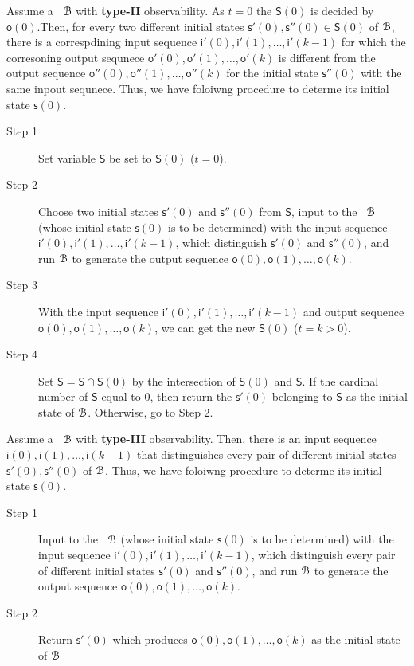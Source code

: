  Assume a \BCN\ ${\mathcal{B}}$  with {\bf type-II}  observability. As $t=0$ the $\mathsf{S}(0)$ is decided by $\mathsf{o}(0)$.Then, for every two different initial states $\mathsf{s}'(0), \mathsf{s}''(0)\in \mathsf{S}(0)$ of ${\mathcal{B}}$, there is a correspdining input sequence $\mathsf{i}'(0),\mathsf{i}'(1),\ldots, \mathsf{i}'(k-1)$ for which the corresoning output sequnece $\mathsf{o}'(0),\mathsf{o}'(1),\ldots,\mathsf{o}'(k)$ is different from the output sequence $\mathsf{o}''(0),\mathsf{o}''(1),\ldots,\mathsf{o}''(k)$ for the initial state $\mathsf{s}''(0)$ with the same inpout sequnece. Thus, we have foloiwng procedure to determe its initial state $\mathsf{s}(0)$.
\begin{description}
	\item[Step 1]  Set variable $\mathsf{S}$ be set to $\mathsf{S}(0)$ ($t=0$).
	\item[Step 2] Choose two initial states $\mathsf{s}'(0)$ and $\mathsf{s}''(0)$ from $\mathsf{S}$, input to the \BCN\ ${\mathcal{B}}$ (whose initial state $\mathsf{s}(0)$ is to be determined) with the input sequence $\mathsf{i}'(0),\mathsf{i}'(1),\ldots, \mathsf{i}'(k-1)$, which distinguish $\mathsf{s}'(0)$ and $\mathsf{s}''(0)$, and run ${\mathcal{B}}$ to generate the output sequence $\mathsf{o}(0),\mathsf{o}(1),\ldots,\mathsf{o}(k)$.
	\item[Step 3] With the input sequence $\mathsf{i}'(0),\mathsf{i}'(1),\ldots, \mathsf{i}'(k-1)$ and output sequence $\mathsf{o}(0),\mathsf{o}(1),\ldots,\mathsf{o}(k)$, we can get the new $\mathsf{S}(0)$ ($t=k>0$).
	\item[Step 4] Set $\mathsf{S}=\mathsf{S}\cap\mathsf{S}(0)$ by the intersection of $\mathsf{S}(0)$ and $\mathsf{S}$. If the cardinal number of $\mathsf{S}$ equal to $0$, then return the $\mathsf{s}'(0)$ belonging to $\mathsf{S}$ as the initial state of ${\mathcal{B}}$. Otherwise, go to Step 2.
\end{description}

Assume a \BCN\ ${\mathcal{B}}$  with {\bf type-III}  observability. Then, there is an input sequence $\mathsf{i}(0),\mathsf{i}(1),\ldots, \mathsf{i}(k-1)$ that distinguishes every pair of different initial states $\mathsf{s}'(0), \mathsf{s}''(0)$ of ${\mathcal{B}}$. Thus, we have foloiwng procedure to determe its initial state $\mathsf{s}(0)$.

 \begin{description}
	\item[Step 1]  Input to the \BCN\ ${\mathcal{B}}$ (whose initial state $\mathsf{s}(0)$ is to be determined) with the input sequence $\mathsf{i}'(0),\mathsf{i}'(1),\ldots, \mathsf{i}'(k-1)$, which distinguish every pair of different initial states $\mathsf{s}'(0)$ and $\mathsf{s}''(0)$, and run ${\mathcal{B}}$ to generate the output sequence $\mathsf{o}(0),\mathsf{o}(1),\ldots,\mathsf{o}(k)$.
	\item[Step 2] Return $\mathsf{s}'(0)$ which produces $\mathsf{o}(0),\mathsf{o}(1),\ldots,\mathsf{o}(k)$ as the initial state of ${\mathcal{B}}$ 
\end{description}


